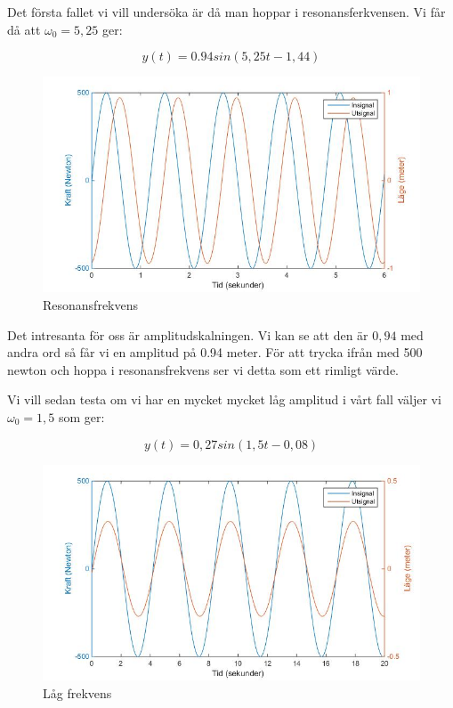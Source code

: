 \documentclass[10pt,a4paper]{article}
\begin{document}
Det första fallet vi vill undersöka är då man hoppar i resonansferkvensen. Vi får då att $\omega_0 = 5,25$ ger:

\begin{equation}
y(t) = 0.94 sin(5,25 t - 1,44)
\end{equation}

\begin{figure}[h]
\begin{center}
\includegraphics[scale=0.4]{sinussvar1}
\caption{Resonansfrekvens}
\end{center}
\end{figure}

Det intresanta för oss är amplitudskalningen. Vi kan se att den är $0,94$ med andra ord så får vi en amplitud på 0.94 meter. För att trycka ifrån med 500 newton och hoppa i resonansfrekvens ser vi detta som ett rimligt värde.

Vi vill sedan testa om vi har en mycket mycket låg amplitud i vårt fall väljer vi $\omega_0 = 1,5$ som ger:

\begin{equation}
y(t) = 0,27 sin(1,5 t - 0,08)
\end{equation}

\begin{figure}[h]
\begin{center}
\includegraphics[scale=0.4]{sinussvar2}
\caption{Låg frekvens}
\end{center}
\end{figure}
\end{document}
